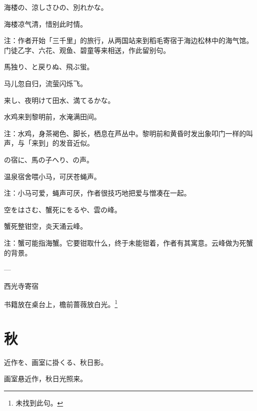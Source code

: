 \begin{haiku}
    {\FH 海楼の、涼しさひの、別れかな。}

    {\FK 海楼凉气清，惜别此时情。}

    {\FT 注：作者开始「三千里」的旅行，从两国站来到稻毛寄宿于海边松林中的海气馆。门徒乙字、六花、观鱼、碧童等来相送，作此留别句。}
\end{haiku}

\begin{haiku}
    {\FH 馬独り、と戻りぬ、飛ぶ蛍。}

    {\FK 马儿忽自归，流萤闪烁飞。}
\end{haiku}

\begin{haiku}
    {\FH {}来し、夜明けて田水、満てるかな。}

    {\FK 水鸡来到黎明前，水淹满田间。}

    {\FT 注：水鸡，身茶褐色、脚长，栖息在芦丛中。黎明前和黄昏时发出象叩门一样的叫声，与「来到」的发音近似。}
\end{haiku}

\begin{haiku}
    {\FH {}の宿に、馬の子へり、の声。}

    {\FK 温泉宿舍喂小马，可厌苍蝇声。}

    {\FT 注：小马可爱，蝇声可厌，作者很技巧地把爱与憎凑在一起。}
\end{haiku}

\begin{haiku}
    {\FH 空をはさむ、蟹死にをるや、雲の峰。}

    {\FK 蟹死整钳空，炎天涌云峰。}

    {\FT 注：蟹可能指海蟹。它要钳取什么，终于未能钳着，作者有其寓意。云峰做为死蟹的背景。}
\end{haiku}

\begin{haiku}
    {\FH ---}

    {\FK 西光寺寄宿}

    {\FK 书籍放在桌台上，檐前蔷薇放白光。\footnote{\FT 未找到此句。}}
\end{haiku}

\section{\FK 秋}

\setcounter{haikucounter}{0}

\begin{haiku}
    {\FH 近作を、画室に掛くる、秋日影。}

    {\FK 画室悬近作，秋日光照来。}
\end{haiku}

